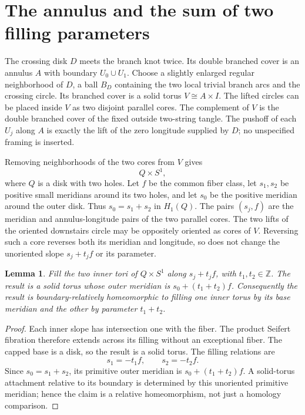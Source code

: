 \documentclass[11pt]{article}
\newtheorem{lemma}[theorem]{Lemma}
\begin{document}
\section{The annulus and the sum of two filling parameters}

The crossing disk $D$ meets the branch knot twice. Its double branched
cover is an annulus $A$ with boundary $U_0\cup U_1$. Choose a slightly
enlarged regular neighborhood of $D$, a ball $B_D$ containing the two
local trivial branch arcs and the crossing circle. Its branched cover
is a solid torus $V\cong A\times I$. The lifted circles can be placed
inside $V$ as two disjoint parallel cores. The complement of $V$ is
the double branched cover of the fixed outside two-string tangle.
The pushoff of each $U_j$ along $A$ is exactly the lift of the
zero longitude supplied by $D$; no unspecified framing is inserted.

Removing neighborhoods of the two cores from $V$ gives
\[
                        Q\times S^1,
\]
where $Q$ is a disk with two holes. Let $f$ be the common fiber class,
let $s_1,s_2$ be positive small meridians around its two holes, and let
$s_0$ be the positive meridian around the outer disk. Thus
$s_0=s_1+s_2$ in $H_1(Q)$. The pairs $(s_j,f)$ are the meridian and
annulus-longitude pairs of the two parallel cores. The two lifts of
the oriented downstairs circle may be oppositely oriented as cores
of $V$. Reversing such a core reverses both its meridian and longitude,
so does not change the unoriented slope $s_j+t_jf$ or its parameter.

\begin{lemma}\label{lem:pants}
Fill the two inner tori of $Q\times S^1$ along $s_j+t_jf$, with
$t_1,t_2\in\mathbb Z$. The result is a solid torus whose outer
meridian is $s_0+(t_1+t_2)f$. Consequently the result is
boundary-relatively homeomorphic to filling one inner torus by its
base meridian and the other by parameter $t_1+t_2$.
\end{lemma}
\begin{proof}
Each inner slope has intersection one with the fiber. The product
Seifert fibration therefore extends across its filling without an
exceptional fiber. The capped base is a disk, so the result is a
solid torus. The filling relations are
\[
                 s_1=-t_1f,\qquad s_2=-t_2f.
\]
Since $s_0=s_1+s_2$, its primitive outer meridian is
$s_0+(t_1+t_2)f$. A solid-torus attachment relative to its boundary
is determined by this unoriented primitive meridian; hence the
claim is a relative homeomorphism, not just a homology comparison.
\end{proof}
\end{document}
